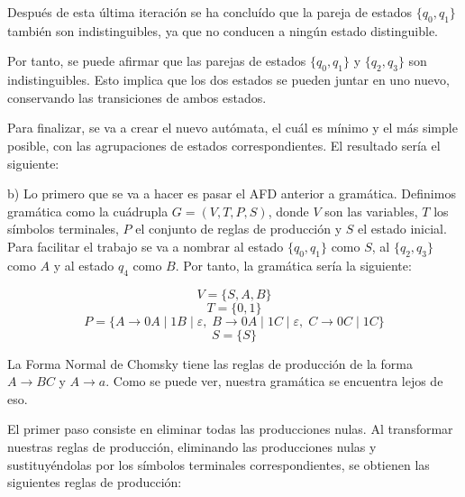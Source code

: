 \documentclass[11pt,a4paper]{article}
\begin{document}
		Después de esta última iteración se ha concluído que la pareja de estados $\{q_0, q_1\}$ también son indistinguibles,
		ya que no conducen a ningún estado distinguible. \par
		
		Por tanto, se puede afirmar que las parejas de estados $\{q_0, q_1\}$ y $\{q_2, q_3\}$ son indistinguibles. Esto
		implica que los dos estados se pueden juntar en uno nuevo, conservando las transiciones de ambos estados. \par
		
		Para finalizar, se va a crear el nuevo autómata, el cuál es mínimo y el más simple posible, con las agrupaciones
		de estados correspondientes. El resultado sería el siguiente:
		
		\begin{figure}[H]
			\centering
		\end{figure}
		
		b) Lo primero que se va a hacer es pasar el AFD anterior a gramática. Definimos gramática como la cuádrupla $G = (V,
		T, P, S)$, donde $V$ son las variables, $T$ los símbolos terminales, $P$ el conjunto de reglas de producción y $S$
		el estado inicial. Para facilitar el trabajo se va a nombrar al estado $\{q_0, q_1\}$ como $S$, al $\{q_2, q_3\}$
		como $A$ y al estado $q_4$ como $B$. Por tanto, la gramática sería la siguiente:
		
		\[V = \{S, A, B\}\]
		\[T = \{0, 1\}\]
		\[P = \{A \rightarrow 0A \; | \; 1B \; | \; \varepsilon, \; B \rightarrow 0A \; | \; 1C \; | \; \varepsilon, \;
				C \rightarrow 0C \; | \; 1C\} \]
		\[S = \{ S \} \]
		
		La Forma Normal de Chomsky tiene las reglas de producción de la forma $A \rightarrow BC$ y $A \rightarrow a$. Como
		se puede ver, nuestra gramática se encuentra lejos de eso. \par
		
		El primer paso consiste en eliminar todas las producciones nulas. Al transformar nuestras reglas de producción,
		eliminando las producciones nulas y sustituyéndolas por los símbolos terminales correspondientes, se obtienen las
		siguientes reglas de producción:
		
\end{document}
